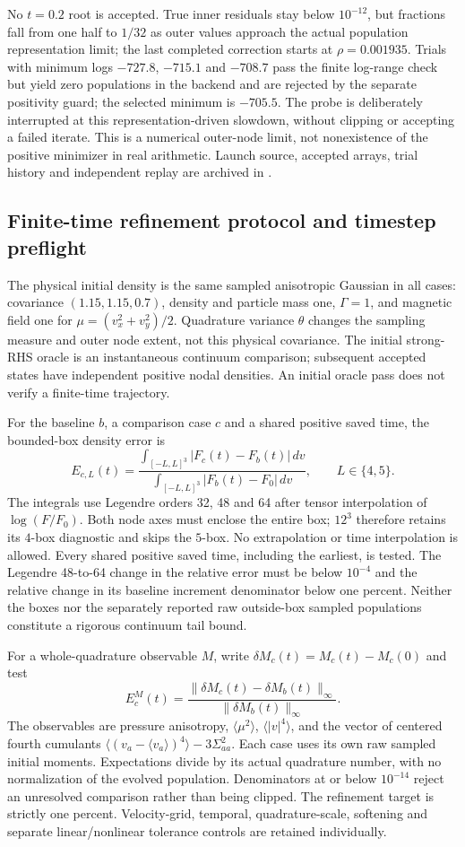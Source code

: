 \documentclass[11pt,letterpaper]{article}
\begin{document}
No $t=0.2$ root is accepted. True inner residuals stay below $10^{-12}$,
but fractions fall from one half to $1/32$ as outer values approach the
actual population representation limit; the last completed correction
starts at $\rho=0.001935$. Trials with minimum logs $-727.8$, $-715.1$
and $-708.7$ pass the finite log-range check but yield zero populations
in the backend and are rejected by the separate positivity guard;
the selected minimum is $-705.5$. The probe is deliberately interrupted
at this representation-driven slowdown, without clipping or accepting a
failed iterate. This is a numerical outer-node limit, not nonexistence
of the positive minimizer in real arithmetic. Launch source, accepted
arrays, trial history and independent replay are archived in
.


\subsection{Finite-time refinement protocol and timestep preflight}
The physical initial density is the same sampled anisotropic Gaussian in
all cases: covariance $(1.15,1.15,0.7)$, density and particle mass one,
$\Gamma=1$, and magnetic field one for
$\mu=(v_x^2+v_y^2)/2$. Quadrature variance $\theta$ changes the sampling
measure and outer node extent, not this physical covariance. The initial
strong-RHS oracle is an instantaneous continuum comparison; subsequent
accepted states have independent positive nodal densities. An initial
oracle pass does not verify a finite-time trajectory.

For the baseline $b$, a comparison case $c$ and a shared positive saved
time, the bounded-box density error is
\[
 E_{c,L}(t)=
 \frac{\int_{[-L,L]^3}|F_c(t)-F_b(t)|\,dv}
      {\int_{[-L,L]^3}|F_b(t)-F_0|\,dv},\qquad L\in\{4,5\}.
\]
The integrals use Legendre orders 32, 48 and 64 after tensor interpolation
of $\log(F/F_0)$. Both node axes must enclose the entire box; $12^3$
therefore retains its $4$-box diagnostic and skips the $5$-box. No
extrapolation or time interpolation is allowed. Every shared positive
saved time, including the earliest, is tested. The Legendre 48-to-64
change in the relative error must be below $10^{-4}$ and the relative
change in its baseline increment denominator below one percent.
Neither the boxes nor the separately reported raw outside-box sampled
populations constitute a rigorous continuum tail bound.

For a whole-quadrature observable $M$, write
$\delta M_c(t)=M_c(t)-M_c(0)$ and test
\[
 E^M_c(t)=\frac{\|\delta M_c(t)-\delta M_b(t)\|_\infty}
                 {\|\delta M_b(t)\|_\infty}.
\]
The observables are pressure anisotropy, $\langle\mu^2\rangle$,
$\langle|v|^4\rangle$, and the vector of centered fourth cumulants
$\langle(v_a-\langle v_a\rangle)^4\rangle-3\Sigma_{aa}^2$.
Each case uses its own raw sampled initial moments. Expectations divide
by its actual quadrature number, with no normalization of the evolved
population. Denominators at or below $10^{-14}$ reject an unresolved
comparison rather than being clipped. The refinement target is strictly
one percent. Velocity-grid, temporal, quadrature-scale, softening and separate
linear/nonlinear tolerance controls are retained individually.
\end{document}
